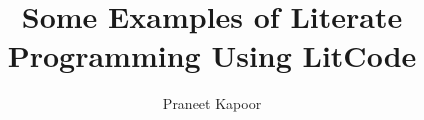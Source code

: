 \documentclass{article}
\begin{document}
\title{Some Examples of Literate Programming Using LitCode}
\author{Praneet Kapoor}
\maketitle





\lstlistoflistings
\end{document}
